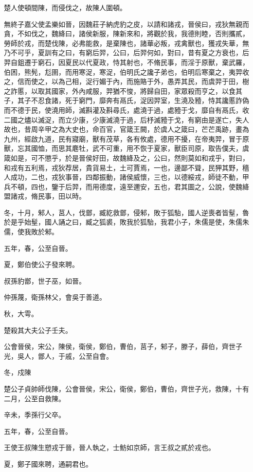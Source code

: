 \begin{pinyinscope}
楚人使頓間陳，而侵伐之，故陳人圍頓。

無終子嘉父使孟樂如晉，因魏莊子納虎豹之皮，以請和諸戎，晉侯曰，戎狄無親而貪，不如伐之，魏絳曰，諸侯新服，陳新來和，將觀於我，我德則睦，否則攜貳，勞師於戎，而楚伐陳，必弗能救，是棄陳也，諸華必叛，戎禽獸也，獲戎失華，無乃不可乎，夏訓有之曰，有窮后羿，公曰，后羿何如，對曰，昔有夏之方衰也，后羿自鉏遷于窮石，因夏民以代夏政，恃其射也，不脩民事，而淫于原獸，棄武羅，伯困，熊髡，尨圉，而用寒浞，寒浞，伯明氏之讒子弟也，伯明后寒棄之，夷羿收之，信而使之，以為己相，浞行媚于內，而施賂于外，愚弄其民，而虞羿于田，樹之詐慝，以取其國家，外內咸服，羿猶不悛，將歸自田，家眾殺而亨之，以食其子，其子不忍食諸，死于窮門，靡奔有鬲氏，浞因羿室，生澆及豷，恃其讒慝詐偽而不德于民，使澆用師，滅斟灌及斟尋氏，處澆于過，處豷于戈，靡自有鬲氏，收二國之燼以滅浞，而立少康，少康滅澆于過，后杼滅豷于戈，有窮由是遂亡，失人故也，昔周辛甲之為大史也，命百官，官箴王闕，於虞人之箴曰，芒芒禹跡，畫為九州，經啟九道，民有寢廟，獸有茂草，各有攸處，德用不擾，在帝夷羿，冒于原獸，忘其國恤，而思其麀牡，武不可重，用不恢于夏家，獸臣司原，取告僕夫，虞箴如是，可不懲乎，於是晉侯好田，故魏絳及之，公曰，然則莫如和戎乎，對曰，和戎有五利焉，戎狄荐居，貴貨易土，土可賈焉，一也，邊鄙不聳，民狎其野，穡人成功，二也，戎狄事晉，四鄰振動，諸侯威懷，三也，以德綏戎，師徒不動，甲兵不頓，四也，鑒于后羿，而用德度，遠至邇安，五也，君其圖之，公說，使魏絳盟諸戎，脩民事，田以時。

冬，十月，邾人，莒人，伐鄫，臧紇救鄫，侵邾，敗于狐駘，國人逆喪者皆髽，魯於是乎始髽，國人誦之曰，臧之狐裘，敗我於狐駘，我君小子，朱儒是使，朱儒朱儒，使我敗於邾。

五年，春，公至自晉。

夏，鄭伯使公子發來聘。

叔孫豹鄫，世子巫，如晉。

仲孫蔑，衛孫林父，會吳于善道。

秋，大雩。

楚殺其大夫公子壬夫。

公會晉侯，宋公，陳侯，衛侯，鄭伯，曹伯，莒子，邾子，滕子，薛伯，齊世子光，吳人，鄫人，于戚，公至自會。

冬，戍陳

楚公子貞帥師伐陳，公會晉侯，宋公，衛侯，鄭伯，曹伯，齊世子光，救陳，十有二月，公至自救陳。

辛未，季孫行父卒。

五年，春，公至自晉。

王使王叔陳生愬戎于晉，晉人執之，士魴如京師，言王叔之貳於戎也。

夏，鄭子國來聘，通嗣君也。


\end{pinyinscope}
